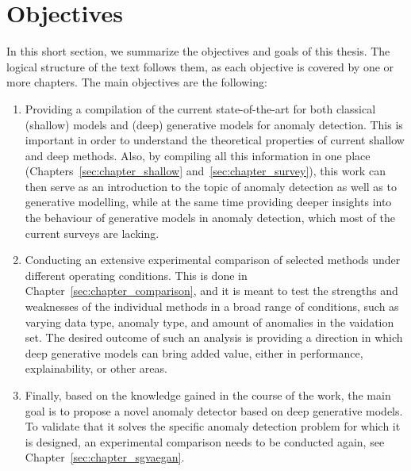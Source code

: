 \section{Objectives} \label{sec:objectives}
In this short section, we summarize the objectives and goals of this thesis. The logical structure of the text follows them, as each objective is covered by one or more chapters. The main objectives are the following:

\begin{enumerate}
    \item Providing a compilation of the current state-of-the-art for both classical (shallow) models and (deep) generative models for anomaly detection. This is important in order to understand the theoretical properties of current shallow and deep methods. Also, by compiling all this information in one place (Chapters~\ref{sec:chapter_shallow} and~\ref{sec:chapter_survey}), this work can then serve as an introduction to the topic of anomaly detection as well as to generative modelling, while at the same time providing deeper insights into the behaviour of generative models in anomaly detection, which most of the current surveys are lacking.
    \item Conducting an extensive experimental comparison of selected methods under different operating conditions. This is done in Chapter~\ref{sec:chapter_comparison}, and it is meant to test the strengths and weaknesses of the individual methods in a broad range of conditions, such as varying data type, anomaly type, and amount of anomalies in the vaidation set. The desired outcome of such an analysis is providing a direction in which deep generative models can bring added value, either in performance, explainability, or other areas. 
    \item Finally, based on the knowledge gained in the course of the work, the main goal is to propose a novel anomaly detector based on deep generative models. To validate that it solves the specific anomaly detection problem for which it is designed, an experimental comparison needs to be conducted again, see Chapter~\ref{sec:chapter_sgvaegan}.
\end{enumerate}

